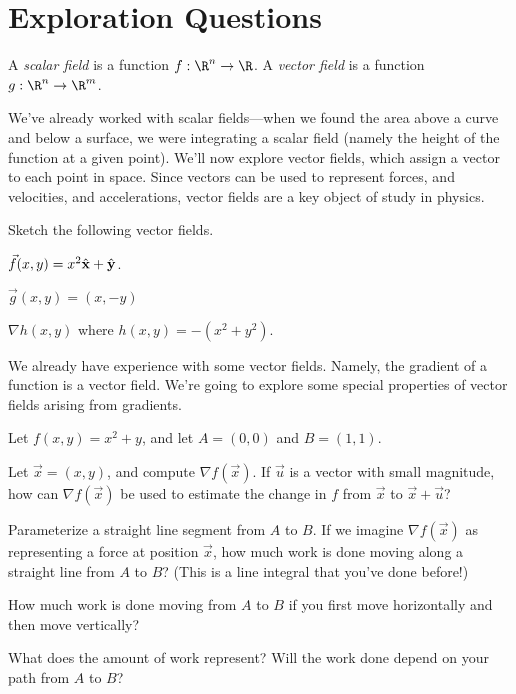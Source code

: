 \newpage
\section*{Exploration Questions}

	\begin{numberlessdefinition}
		A \emph{scalar field} is a function $f:\R^n\to \R$.  A \emph{vector field}
		is a function $g:\R^n\to\R^m$.
	\end{numberlessdefinition}

	We've already worked with scalar fields---when we found the area above a curve and below
	a surface, we were integrating a scalar field (namely the height of the function at a given point).
	We'll now explore vector fields, which assign a vector to each point in space.
	Since vectors can be used to represent forces, and velocities, and accelerations, vector fields are a key object of study in physics.

\begin{question}
	Sketch the following vector fields.
	\begin{parts}
		\item $\vec f(x,y) = x^2{\hat {\mathbf x}} +{\hat {\mathbf y}}$.
		\item $\vec g(x,y) = (x,-y)$
		\item $\nabla h(x,y)$ where $h(x,y) = -(x^2+y^2)$.
	\end{parts}
\end{question}

	We already have experience with some vector fields.  Namely, the gradient of a function is a vector field.
	We're going to explore some special properties of vector fields arising from gradients.
	
\begin{question}
	Let $f(x,y) = x^2+y$, and let $A=(0,0)$ and $B=(1,1)$.
	\begin{parts}
		\item Let $\vec x=(x,y)$, and compute $\nabla f(\vec x)$.   
			If $\vec u$ is a vector with small
			magnitude, how can $\nabla f(\vec x)$ be used to
			estimate the change in $f$ from $\vec x$ to $\vec x+\vec u$?
		\item Parameterize a straight line segment from $A$ to $B$.  If we imagine
			$\nabla f(\vec x)$ as representing a force at position $\vec x$,
			how much work is done moving along a straight line
			from $A$ to $B$?  (This is a line integral that you've done
			before!)
		\item How much work is done moving from $A$ to $B$ if you first move
			horizontally and then move vertically?
		\item What does the amount of work represent?  Will the work done
			depend on your path from $A$ to $B$?

	\end{parts}
\end{question}

